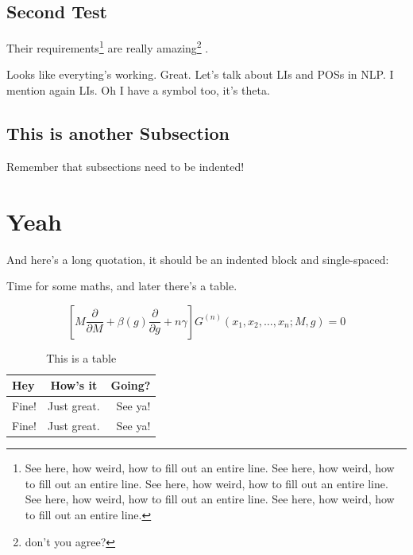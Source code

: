 \begin{subsecs}
\subsection{Second Test}
Their \cite{audibert:2004} requirements\footnote{See here, how weird, how to fill out an entire line. See here, how weird, how to fill out an entire line. See here, how weird, how to fill out an entire line. See here, how weird, how to fill out an entire line. See here, how weird, how to fill out an entire line. } are really amazing\footnote{don't you agree?} \cite{budanitsky:hirst:2006}.

Looks like everyting's working. Great. Let's talk about \glspl{LI} and \glspl{POS} in \gls{NLP}. I mention again \glspl{LI}. Oh I have a symbol too, it's \gls{theta}.

\subsection{This is another Subsection}

Remember that subsections need to be indented! 

\end{subsecs}

\section{Yeah}

And here's a long quotation, it should be an indented block and single-spaced:

\begin{quotation}
\lipsum[5]
\end{quotation}

Time for some maths, and later there's a table.

\begin{equation}
\left[M\frac{\partial }{\partial M}+\beta(g)\frac{\partial }{\partial g}+n\gamma\right] G^{(n)}(x_1,x_2,\ldots,x_n;M,g)=0
\end{equation}

\begin{table}[hbt!]
\caption{This is a table}
\centering
\begin{tabular}{ l c r }
\hline
Hey & How's it & Going?\\ \hline
Fine! & Just great. & See ya!\\
Fine! & Just great. & See ya!\\
\hline
\end{tabular}
\end{table}

\lipsum[7-12]